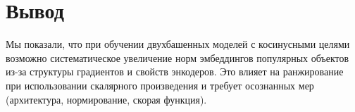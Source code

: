 \section{Вывод}
Мы показали, что при обучении двухбашенных моделей с косинусными целями возможно систематическое увеличение норм эмбеддингов популярных объектов из-за структуры градиентов и свойств энкодеров. Это влияет на ранжирование при использовании скалярного произведения и требует осознанных мер (архитектура, нормирование, скорая функция).
